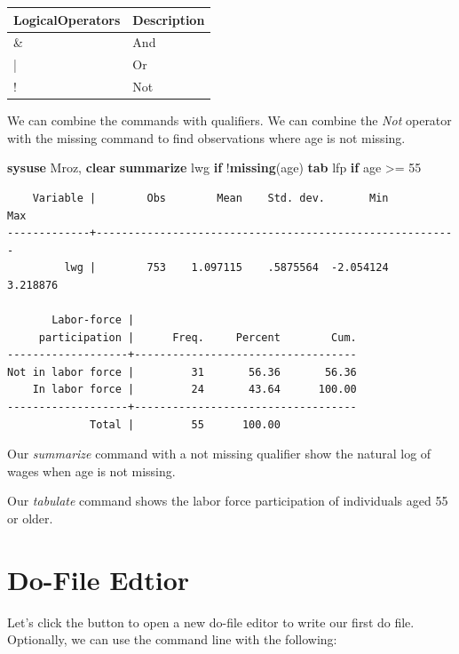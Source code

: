 \documentclass[
]{book}
\newenvironment{Shaded}{\begin{snugshade}}{\end{snugshade}}
\newcommand{\FunctionTok}[1]{\textcolor[rgb]{0.13,0.29,0.53}{\textbf{#1}}}
\newcommand{\KeywordTok}[1]{\textcolor[rgb]{0.13,0.29,0.53}{\textbf{#1}}}
\newcommand{\NormalTok}[1]{#1}
\begin{document}
\begin{tabular}{l|l}
\hline
LogicalOperators & Description\\
\hline
\& & And\\
\hline
| & Or\\
\hline
! & Not\\
\hline
\end{tabular}

We can combine the commands with qualifiers. We can combine the \emph{Not} operator with the missing command to find observations where age is not missing.

\begin{Shaded}
\begin{Highlighting}[]
\KeywordTok{sysuse}\NormalTok{ Mroz, }\KeywordTok{clear}
\KeywordTok{summarize}\NormalTok{ lwg }\KeywordTok{if}\NormalTok{ !}\FunctionTok{missing}\NormalTok{(age)}
\KeywordTok{tab}\NormalTok{ lfp }\KeywordTok{if}\NormalTok{ age \textgreater{}= 55}
\end{Highlighting}
\end{Shaded}

\begin{verbatim}
    Variable |        Obs        Mean    Std. dev.       Min        Max
-------------+---------------------------------------------------------
         lwg |        753    1.097115    .5875564  -2.054124   3.218876

       Labor-force |
     participation |      Freq.     Percent        Cum.
-------------------+-----------------------------------
Not in labor force |         31       56.36       56.36
    In labor force |         24       43.64      100.00
-------------------+-----------------------------------
             Total |         55      100.00
\end{verbatim}

Our \emph{summarize} command with a not missing qualifier show the natural log of wages when age is not missing.

Our \emph{tabulate} command shows the labor force participation of individuals aged 55 or older.

\section{Do-File Edtior}\label{do-file-edtior}

Let's click the button to open a new do-file editor to write our first do file. Optionally, we can use the command line with the following:
\end{document}
